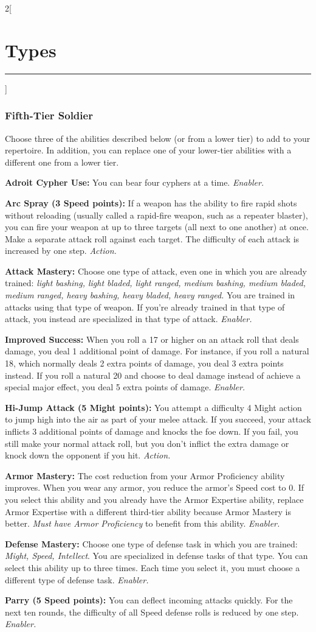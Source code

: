 \documentclass[a4paper,10pt,final]{book}
\newcommand{\HRule}{\rule{\linewidth}{0.5mm}} %
\newcommand{\newSection}[1]{\section*{#1} \addcontentsline{toc}{section}{#1} \label{sec:#1} \HRule}
\newcommand{\itemAbility}[2]{\textcolor{25gray}{\textbullet\textbf{ #1:}} {#2}\par}
\newcommand{\enabler}{\textit{ Enabler.}}
\newcommand{\action}{\textit{ Action.}}
\newenvironment{docsection}[1]
{
  \begin{multicols*}{2}[\newSection{#1}]
}
{
  \end{multicols*}
  \newpage
}
\begin{document}
\begin{docsection}{Types}
\subsubsection*{Fifth-Tier Soldier}
\label{subsub:soldierFifthTier}
Choose three of the abilities described below (or from a lower tier) to add to your repertoire. In addition, you can replace one of your lower-tier abilities with a different one from a lower tier.\par
\itemAbility{Adroit Cypher Use}{You can bear four
cyphers at a time.\enabler}
\itemAbility{Arc Spray (3 Speed points)}{If a weapon
has the ability to fire rapid shots without
reloading (usually called a rapid-fire
weapon, such as a repeater blaster), you
can fire your weapon at up to three targets
(all next to one another) at once. Make a
separate attack roll against each target. The
difficulty of each attack is increased by one
step.\action}
\itemAbility{Attack Mastery}{Choose one
type of attack, even one in which you are
already trained: \textit{light bashing, light bladed,
light ranged, medium bashing, medium
bladed, medium ranged, heavy bashing,
heavy bladed, heavy ranged.} You are
trained in attacks using that type of weapon.
If you’re already trained in that type of
attack, you instead are specialized in that
type of attack.\enabler}
\itemAbility{Improved Success}{When you roll a 17 or
higher on an attack roll that deals damage,
you deal 1 additional point of damage. For
instance, if you roll a natural 18, which
normally deals 2 extra points of damage,
you deal 3 extra points instead. If you roll
a natural 20 and choose to deal damage
instead of achieve a special major effect,
you deal 5 extra points of damage.\enabler}
\itemAbility{Hi-Jump Attack (5 Might points)}{You attempt
a difficulty 4 Might action to jump high into
the air as part of your melee attack. If you
succeed, your attack inflicts 3 additional
points of damage and knocks the foe down.
If you fail, you still make your normal attack
roll, but you don’t inflict the extra damage or
knock down the opponent if you hit.\action}
\itemAbility{Armor Mastery}{The cost reduction
from your Armor Proficiency ability
improves. When you wear any armor, you
reduce the armor’s Speed cost to 0. If you
select this ability and you already have the
Armor Expertise ability, replace
Armor Expertise with a different
third-tier ability because Armor Mastery is better.
\textit{Must have Armor Proficiency} to benefit from this ability.\enabler}
\itemAbility{Defense Mastery}{Choose one
type of defense task in which you are
trained: \textit{Might, Speed, Intellect}. You are
specialized in defense tasks of that type.
You can select this ability up to three times.
Each time you select it, you must choose a
different type of defense task.\enabler}
\itemAbility{Parry (5 Speed points)}{You can deflect
incoming attacks quickly. For the next ten
rounds, the difficulty of all Speed defense
rolls is reduced by one step.\enabler}


\end{docsection}
\end{document}

